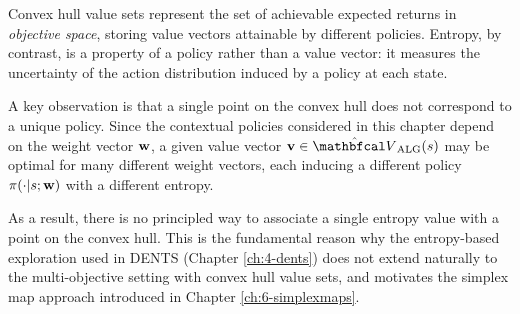 
    Convex hull value sets represent the set of achievable expected returns in \textit{objective space}, storing value vectors attainable by different policies. Entropy, by contrast, is a property of a policy rather than a value vector: it measures the uncertainty of the action distribution induced by a policy at each state.

    A key observation is that a single point on the convex hull does not correspond to a unique policy.
    Since the contextual policies considered in this chapter depend on the weight vector $\mathbf{w}$, a given value vector $\bff{v}\in\Valg(s)$ may be optimal for many different weight vectors, each inducing a different policy $\pi(\cdot|s;\mathbf{w})$ with a different entropy. 

    As a result, there is no principled way to associate a single entropy value with a point on the convex hull. This is the fundamental reason why the entropy-based exploration used in DENTS (Chapter \ref{ch:4-dents}) does not extend naturally to the multi-objective setting with convex hull value sets, and motivates the simplex map approach introduced in Chapter \ref{ch:6-simplexmaps}.










